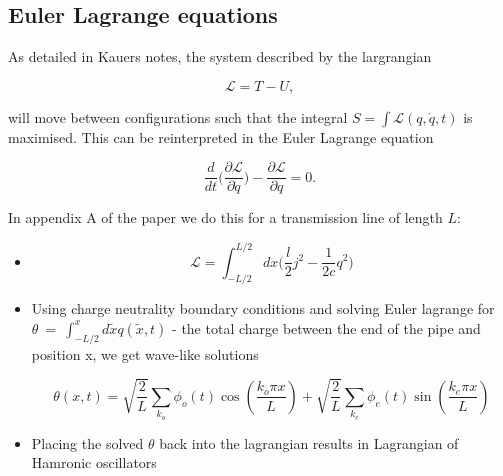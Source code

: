  \subsection{Euler Lagrange equations}
  As detailed in Kauers notes, the system described by the largrangian
  
  \[
  	\mathcal{L} = T - U,
  \]
  
  \noindent will move between configurations such that the integral $ S = \int \mathcal{L}(q,\dot{q},t) $ is maximised. This can be reinterpreted in the Euler Lagrange equation
  
  \[
  	\frac{d}{dt}\big(\frac{\partial\mathcal{L}}{\partial \dot{q}}\big) - \frac{\partial\mathcal{L}}{\partial q} = 0.
  \]
  
  In appendix A of the paper we do this for a transmission line of length $ L $:
  \begin{itemize}
  	\item \[ 
  		\mathcal{L} = \int_{-L/2}^{L/2}dx\big(\frac{l}{2}j^2-\frac{1}{2c}q^2\big)
  	\]
  	\item Using charge neutrality boundary conditions and solving Euler lagrange for $ \theta~=~\int_{-L/2}^{x}d\tilde{x}q(\tilde{x},t) $ - the total charge between the end of the pipe and position x, we get wave-like solutions
  	
  	\[
  		\theta(x,t) = \sqrt{\frac{2}{L}}\sum_{k_o}\phi_o(t)\cos(\frac{k_o\pi x}{L}) + \sqrt{\frac{2}{L}}\sum_{k_e}\phi_e(t)\sin(\frac{k_e\pi x}{L}) 
  	\]
  	
  	
  	\item Placing the solved $ \theta $ back into the lagrangian results in Lagrangian of Hamronic oscillators
  \end{itemize}
  
   \newpage
 
